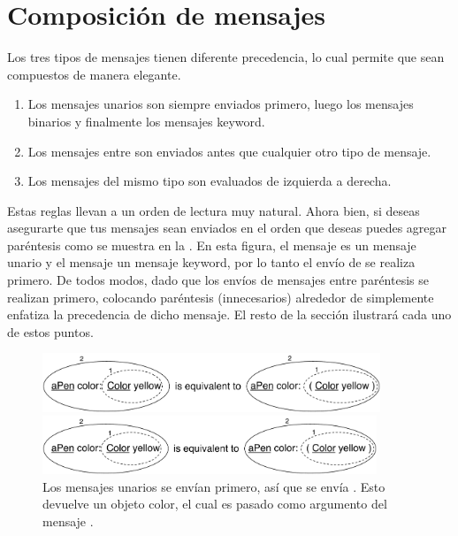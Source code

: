 \documentclass[a4paper,10pt,twoside]{book}
\begin{document}

\section{Composici\'on de mensajes}
Los tres tipos de mensajes tienen diferente precedencia, lo cual permite que sean compuestos de manera elegante.

\begin{enumerate}
\item Los mensajes unarios son siempre enviados primero, luego los mensajes binarios y finalmente los mensajes keyword. 
\item Los mensajes entre  son enviados antes que cualquier otro tipo de mensaje.
\item Los mensajes del mismo tipo son evaluados de izquierda a derecha. 
\end{enumerate}

Estas reglas llevan a un orden de lectura muy natural. Ahora bien, si deseas asegurarte que tus mensajes sean enviados en el orden que deseas puedes agregar par\'entesis como se muestra en la . En esta figura, el mensaje  es un mensaje unario y el mensaje  un mensaje keyword, por lo tanto el env\'io de  se realiza primero. De todos modos, dado que los env\'ios de mensajes entre par\'entesis se realizan primero, colocando par\'entesis (innecesarios) alrededor de  simplemente enfatiza la precedencia de dicho mensaje. El resto de la secci\'on ilustrar\'a cada uno de estos puntos.

\begin{figure}[ht]
\ifluluelse
	{\centerline{\includegraphics[width=0.9\textwidth]{uKeyUn}} }
	{\centerline{\includegraphics[width=10cm]{uKeyUn}} }
\caption{Los mensajes unarios se env\'ian primero, as\'i que se env\'ia . Esto devuelve un objeto color, el cual es pasado como argumento del mensaje .}
\end{figure}
\end{document}
